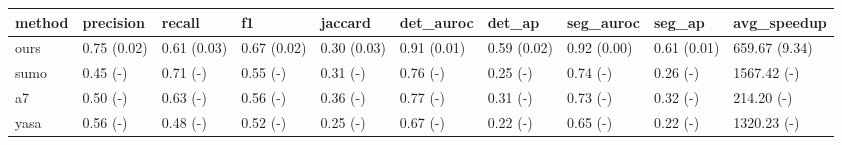 \begin{tabular}{llllllllll}
\toprule
method & precision & recall & f1 & jaccard & det_auroc & det_ap & seg_auroc & seg_ap & avg_speedup \\
\midrule
ours & 0.75 (0.02) & 0.61 (0.03) & 0.67 (0.02) & 0.30 (0.03) & 0.91 (0.01) & 0.59 (0.02) & 0.92 (0.00) & 0.61 (0.01) & 659.67 (9.34) \\
sumo & 0.45 (-) & 0.71 (-) & 0.55 (-) & 0.31 (-) & 0.76 (-) & 0.25 (-) & 0.74 (-) & 0.26 (-) & 1567.42 (-) \\
a7 & 0.50 (-) & 0.63 (-) & 0.56 (-) & 0.36 (-) & 0.77 (-) & 0.31 (-) & 0.73 (-) & 0.32 (-) & 214.20 (-) \\
yasa & 0.56 (-) & 0.48 (-) & 0.52 (-) & 0.25 (-) & 0.67 (-) & 0.22 (-) & 0.65 (-) & 0.22 (-) & 1320.23 (-) \\
\bottomrule
\end{tabular}
